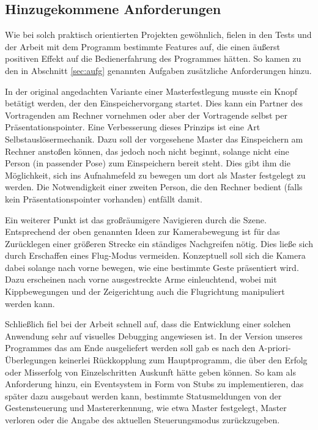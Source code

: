 	\subsection{Hinzugekommene Anforderungen}
	Wie bei solch praktisch orientierten Projekten gewöhnlich, fielen in den Tests und der Arbeit mit dem Programm bestimmte Features auf, die einen äußerst positiven Effekt auf die Bedienerfahrung des Programmes hätten. So kamen zu den in Abschnitt \ref{sec:aufg} genannten Aufgaben zusätzliche Anforderungen hinzu.\par
	In der original angedachten Variante einer Masterfestlegung musste ein Knopf betätigt werden, der den Einspeichervorgang startet. Dies kann ein Partner des Vortragenden am Rechner vornehmen oder aber der Vortragende selbst per Präsentationspointer. Eine Verbesserung dieses Prinzips ist eine Art Selbstauslösermechanik. Dazu soll der vorgesehene Master das Einspeichern am Rechner anstoßen können, das jedoch noch nicht beginnt, solange nicht eine Person (in passender Pose) zum Einspeichern bereit steht. Dies gibt ihm die Möglichkeit, sich ins Aufnahmefeld zu bewegen um dort als Master festgelegt zu werden. Die Notwendigkeit einer zweiten Person, die den Rechner bedient (falls kein Präsentationspointer vorhanden) entfällt damit.\par 
	Ein weiterer Punkt ist das großräumigere Navigieren durch die Szene. Entsprechend der oben genannten Ideen zur Kamerabewegung ist für das Zurücklegen einer größeren Strecke ein ständiges Nachgreifen nötig. Dies ließe sich durch Erschaffen eines \glqq{}Flug-Modus\grqq{} vermeiden. Konzeptuell soll sich die Kamera dabei solange nach vorne bewegen, wie eine bestimmte Geste präsentiert wird. Dazu erscheinen nach vorne ausgestreckte Arme einleuchtend, wobei mit Kippbewegungen und der Zeigerichtung auch die Flugrichtung manipuliert werden kann.\par 
	Schließlich fiel bei der Arbeit schnell auf, dass die Entwicklung einer solchen Anwendung sehr auf visuelles Debugging angewiesen ist. In der Version unseres Programmes das am Ende ausgeliefert werden soll gab es nach den A-priori-Überlegungen keinerlei Rückkopplung zum Hauptprogramm, die über den Erfolg oder Misserfolg von Einzelschritten Auskunft hätte geben können. So kam als Anforderung hinzu, ein Eventsystem in Form von Stubs zu implementieren, das später dazu ausgebaut werden kann, bestimmte Statusmeldungen von der Gestensteuerung und Mastererkennung, wie etwa \glqq{}Master festgelegt\grqq{}, \glqq{}Master verloren\grqq{} oder die Angabe des aktuellen Steuerungsmodus zurückzugeben.
